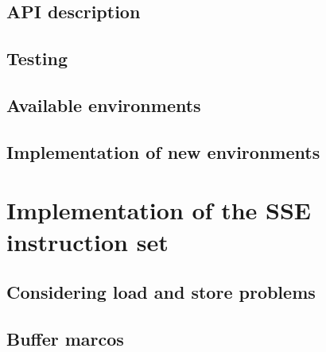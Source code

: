       

    \section{API description} 

    \section{Testing} 

    \section{Available environments} 

    \section{Implementation of new environments} 

\chapter{Implementation of the SSE instruction set}
    \label{ch:sse}

    

    \section{Considering load and store problems}  

    \section{Buffer marcos} 
      

%
%

